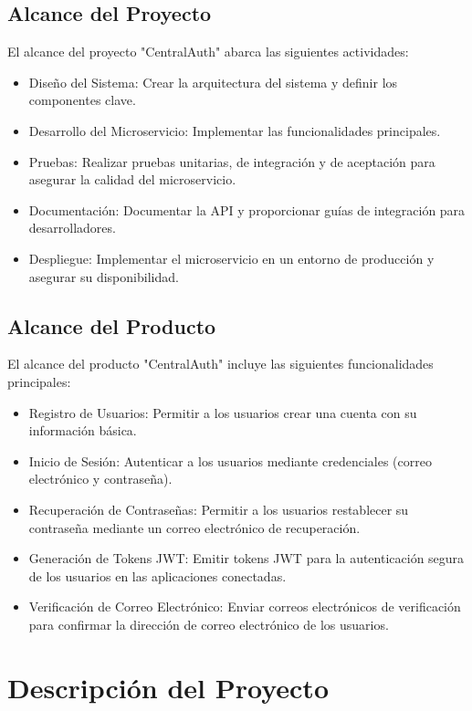 \documentclass{article}
\begin{document}
\subsection{Alcance del Proyecto}

El alcance del proyecto "CentralAuth" abarca las siguientes actividades:
\begin{itemize}
    \item Diseño del Sistema: Crear la arquitectura del sistema y definir los componentes clave.
    \item Desarrollo del Microservicio: Implementar las funcionalidades principales.
    \item Pruebas: Realizar pruebas unitarias, de integración y de aceptación para asegurar la calidad del microservicio.
    \item Documentación: Documentar la API y proporcionar guías de integración para desarrolladores.
    \item Despliegue: Implementar el microservicio en un entorno de producción y asegurar su disponibilidad.
\end{itemize}

\subsection{Alcance del Producto}

El alcance del producto "CentralAuth" incluye las siguientes funcionalidades principales:
\begin{itemize}
    \item Registro de Usuarios: Permitir a los usuarios crear una cuenta con su información básica.
    \item Inicio de Sesión: Autenticar a los usuarios mediante credenciales (correo electrónico y contraseña).
    \item Recuperación de Contraseñas: Permitir a los usuarios restablecer su contraseña mediante un correo electrónico de recuperación.
    \item Generación de Tokens JWT: Emitir tokens JWT para la autenticación segura de los usuarios en las aplicaciones conectadas.
    \item Verificación de Correo Electrónico: Enviar correos electrónicos de verificación para confirmar la dirección de correo electrónico de los usuarios.
\end{itemize}
\newpage

\section{Descripción del Proyecto}
\end{document}
